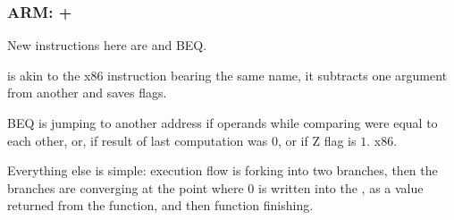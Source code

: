 \subsubsection{ARM: \OptimizingKeil + \ThumbMode}



{New instructions here are \CMP and \ac{BEQ}.}

\CMP {}
{is akin to the x86 instruction bearing the same name, it subtracts one argument from another and saves flags.}

\ac{BEQ} 
{is jumping to another address if operands while comparing were equal to each other, or,
if result of last computation was $0$, or if Z flag is $1$.}
 x86.

{Everything else is simple: execution flow is forking into two branches, then the branches are 
converging at the point
where $0$ is written into the , as a value returned from the function, and then function finishing.}

